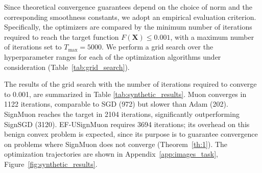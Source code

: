 \documentclass{article}
\begin{document}
Since theoretical convergence guarantees depend on the choice of norm and the corresponding smoothness constants, we adopt an empirical evaluation criterion. Specifically, the optimizers are compared by the minimum number of iterations required to reach the target function $F(\mathbf{X}) \le 0.001$, with a maximum number of iterations set to $T_{\max} = 5000$.  We perform a grid search over the hyperparameter ranges for each of the optimization algorithms under consideration (Table~\ref{tab:grid_search}).

The results of the grid search with the number of iterations required to converge to 0.001, are summarized in Table \ref{tab:synthetic_results}. Muon converges in 1122 iterations, comparable to SGD (972) but slower than Adam (202). SignMuon reaches the target in 2104 iterations, significantly outperforming SignSGD (3120). EF-USignMuon requires 3694 iterations; its overhead on this benign convex problem is expected, since its purpose is to guarantee convergence on problems where SignMuon does not converge (Theorem~\ref{th:1}). The optimization trajectories are shown in Appendix~\ref{app:images_task}, Figure~\ref{fig:synthetic_results}.

\end{document}
